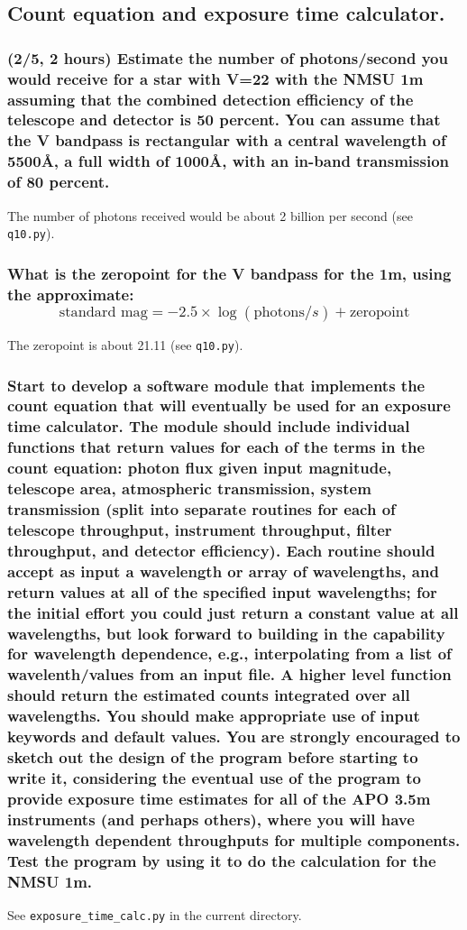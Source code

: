\documentclass[12pt]{article}
\begin{document}
\subsection*{Count equation and exposure time calculator.}

\subsubsection{(2/5, 2 hours) Estimate the number of photons/second
you would receive for a star with V=22 with the NMSU 1m assuming that
the combined detection efficiency of the telescope and detector is 50
percent. You can assume that the V bandpass is rectangular with a
central wavelength of 5500\AA{}, a full width of 1000\AA{}, with an
in-band transmission of 80 percent.}
The number of photons received would be about 2 billion per second
(see \texttt{q10.py}).
\subsubsection{What is the zeropoint for the V bandpass for the 1m,
        using the approximate:
        $$ \textrm{standard\ mag} = - 2.5\times\log(\textrm{photons}/s)
        + {\textrm{zeropoint}} $$}
        The zeropoint is about 21.11
        (see \texttt{q10.py}).
\subsubsection{Start to develop a software module that implements the count
        equation that will eventually be used for an exposure time calculator.
        The module should include individual functions that return values for
        each of the terms in the count equation: photon flux given input magnitude,
        telescope area, atmospheric transmission, system transmission
        (split into separate routines for each of telescope throughput,
        instrument throughput, filter throughput, and detector efficiency).
        Each routine should accept as input a wavelength or array of wavelengths,
        and return values at all of the specified input wavelengths;
        for the initial effort you could just return a constant value
        at all wavelengths, but look forward to building in the capability
        for wavelength dependence, e.g., interpolating from a list of
        wavelenth/values from an input file. A higher level function should
        return the estimated counts integrated over all wavelengths.
        You should make appropriate use of input keywords and default values.
        You are strongly encouraged to sketch out the design of the program
        before starting to write it, considering the eventual use of the
        program to provide exposure time estimates for all of the APO 3.5m
        instruments (and perhaps others), where you will have wavelength
        dependent throughputs for multiple components.
        Test the program by using it to do the calculation for the
        NMSU 1m.}

        See \texttt{exposure\_time\_calc.py} in the current directory.
\end{document}

